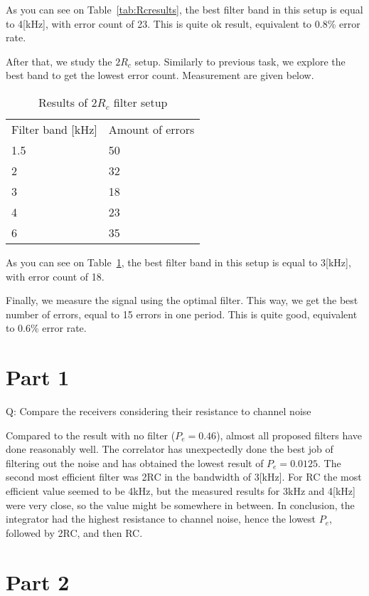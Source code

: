 \documentclass{article}
\begin{document}
As you can see on Table~\ref{tab:Rcresults}, the best filter band in this
setup is equal to 4[kHz], with error count of 23. This is quite ok result,
equivalent to 0.8\% error rate.

After that, we study the $2 R_c$ setup. Similarly to previous task, we
explore the best band to get the lowest error count.
Measurement are given below.
\begin{table}[ht!]
    \caption{Results of $2R_c$ filter setup}
    \label{tab:2Rcresults}
    \begin{center}
        \begin{tabular}[c]{l|l}
            Filter band [kHz] & Amount of errors \\
            1.5 & 50\\
            2 & 32\\
            3 & 18\\
            4 & 23\\
            6 & 35\\
        \end{tabular}
    \end{center}
\end{table}

As you can see on Table~\ref{tab:2Rcresults}, the best filter band in this
setup is equal to 3[kHz], with error count of 18.

Finally, we measure the signal using the optimal filter. This way, we get the
best number of errors, equal to 15 errors in one period. This is quite good,
equivalent to 0.6\% error rate.

\section*{Part 1}
Q: Compare the receivers considering their resistance to channel noise 

Compared to the result with no filter ($P_e=0.46$), almost all proposed filters
have done reasonably well. The correlator has unexpectedly done the best job of
filtering out the noise and has obtained the lowest result of $P_e=0.0125$. The
second most efficient filter was 2RC in the bandwidth of 3[kHz]. For RC the most
efficient value seemed to be 4kHz, but the measured results for 3kHz and 4[kHz]
were very close, so the value might be somewhere in between. In conclusion, the
integrator had the highest resistance to channel noise, hence the lowest $P_e$,
followed by 2RC, and then RC. 

\section*{Part 2} 
\end{document}
